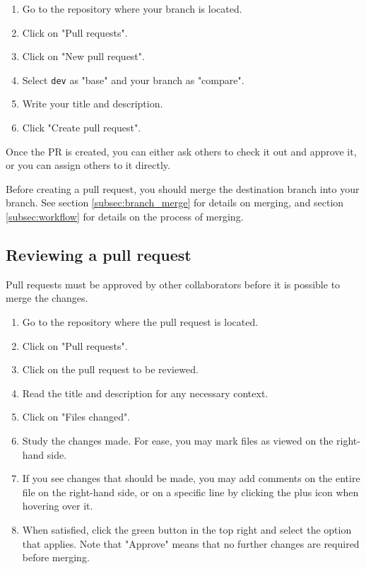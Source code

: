 \documentclass[12pt,a4paper]{article}
\begin{document}
        \begin{enumerate}
            \item Go to the repository where your branch is located.
            \item Click on "Pull requests".
            \item Click on "New pull request".
            \item Select \verb|dev| as "base" and your branch as "compare".
            \item Write your title and description.
            \item Click "Create pull request".
        \end{enumerate}
        
        Once the PR is created, you can either ask others to check it out and approve it, or you can assign others to it directly.
    
        Before creating a pull request, you should merge the destination branch into your branch. See section \ref{subsec:branch_merge} for details on merging, and section \ref{subsec:workflow} for details on the process of merging.
        
    \subsection{Reviewing a pull request}
        Pull requests must be approved by other collaborators before it is possible to merge the changes.
    
        \begin{enumerate}
            \item Go to the repository where the pull request is located.
            \item Click on "Pull requests".
            \item Click on the pull request to be reviewed.
            \item Read the title and description for any necessary context.
            \item Click on "Files changed".
            \item Study the changes made. For ease, you may mark files as viewed on the right-hand side.
            \item If you see changes that should be made, you may add comments on the entire file on the right-hand side, or on a specific line by clicking the plus icon when hovering over it.
            \item When satisfied, click the green button in the top right and select the option that applies. Note that "Approve" means that no further changes are required before merging.
        \end{enumerate}
        
\end{document}
